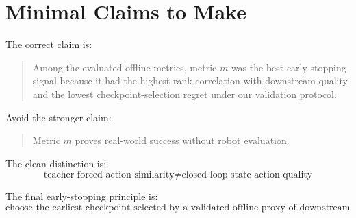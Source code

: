 \documentclass[11pt]{article}
\begin{document}
\section{Minimal Claims to Make}

The correct claim is:
\begin{quote}
Among the evaluated offline metrics, metric $m$ was the best early-stopping signal because it had the highest rank correlation with downstream quality and the lowest checkpoint-selection regret under our validation protocol.
\end{quote}

Avoid the stronger claim:
\begin{quote}
Metric $m$ proves real-world success without robot evaluation.
\end{quote}

The clean distinction is:
\begin{equation}
\boxed{
\text{teacher-forced action similarity}
\neq
\text{closed-loop state-action quality}
}
\end{equation}

The final early-stopping principle is:
\begin{equation}
\boxed{
\text{choose the earliest checkpoint selected by a validated offline proxy of downstream quality.}
}
\end{equation}
\end{document}
